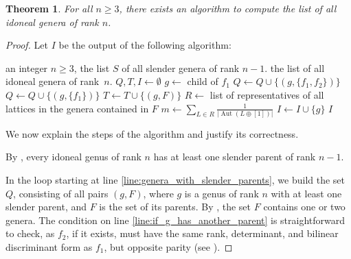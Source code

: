 \documentclass[a4paper]{amsart}
\newenvironment{myalgorithm}{\captionsetup{type=algType}}{}
\theoremstyle{definition}
\theoremstyle{plain}
\newtheorem{theorem}[definition]{Theorem}
\DeclareMathOperator{\Aut}{Aut}
\begin{document}
\begin{theorem} \label{thm:algorithm.idoneal}
    For all \(n \geq 3\), there exists an algorithm to compute the list of all idoneal genera of rank \(n\).
\end{theorem}
\begin{proof}
    Let \(I\) be the output of the following algorithm:
    \begin{myalgorithm}\caption{Idoneal genera}\label{alg:idoneal_genera}
    \begin{algorithmic}[1]
        \REQUIRE an integer \(n \geq 3\), the list \(S\) of all slender genera of rank \(n-1\).
        \ENSURE the list of all idoneal genera of rank~\(n\).
        \STATE \(Q,T,I \longleftarrow \emptyset\)
         \label{line:genera_with_slender_parents}
            \STATE \(g \longleftarrow\) child of \(f_1\)
             \label{line:if_g_has_another_parent}
                \STATE \(Q \longleftarrow Q \cup \{(g, \{f_1,f_2\})\}\)
            \ELSE
                \STATE \(Q \longleftarrow Q \cup \{(g,\{f_1\})\}\) 
            \ENDIF
        \ENDFOR
         \label{line:sieve}
             \label{eq:sieve}
                \STATE \(T \longleftarrow T \cup \{(g,F)\}\)
            \ENDIF
        \ENDFOR
         \label{step:loop_representatives}
            \STATE \(R \longleftarrow\) list of representatives of all lattices in the genera contained in \(F\) \label{step:representatives}
            \STATE \(m \longleftarrow \displaystyle \sum_{L \in R} \frac{1}{|{\Aut(L \oplus [1])}|}\) \label{step:m}
                \STATE \(I \longleftarrow I \cup \{g\}\)
            \ENDIF
        \ENDFOR
        \RETURN \(I\)
    \end{algorithmic}
    \end{myalgorithm}

    We now explain the steps of the algorithm and justify its correctness.

    By , every idoneal genus of rank \(n\) has at least one slender parent of rank \(n-1\). 

    In the loop starting at line \ref{line:genera_with_slender_parents}, we build the set \(Q\), consisting of all pairs \((g, F)\), where \(g\) is a genus of rank \(n\) with at least one slender parent, and \(F\) is the set of its parents. 
    By , the set \(F\) contains one or two genera. 
    The condition on line \ref{line:if_g_has_another_parent} is straightforward to check, as \(f_2\), if it exists, must have the same rank, determinant, and bilinear discriminant form as \(f_1\), but opposite parity (see ).


\end{proof}
\end{document}
